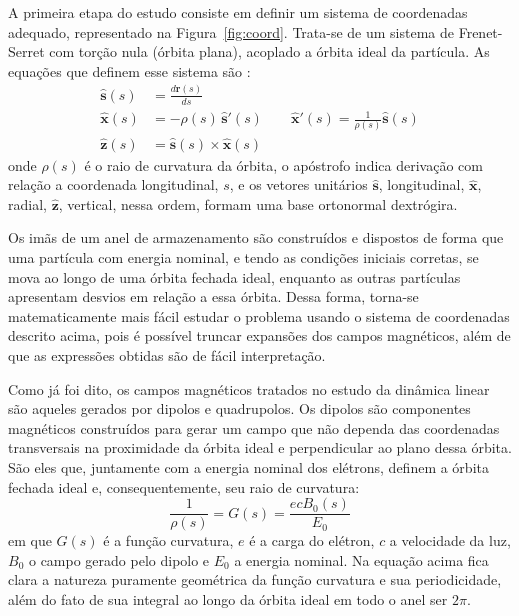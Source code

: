 A primeira etapa do estudo consiste em definir um sistema de coordenadas adequado, representado na \mbox{Figura~\ref{fig:coord}}. Trata-se de um sistema de Frenet-Serret com torção nula (órbita plana), acoplado a órbita ideal da partícula.
As equações que definem esse sistema são \cite{frenet}:
\begin{align} \label{eq:coord}
 \hat{\mathbf{s}}(s) &= \frac{d\mathbf{r}(s)}{d s} \nonumber\\
 \hat{\mathbf{x}}(s) &= -\rho(s)\,\hat{\mathbf{s}}'(s) \qquad
\hat{\mathbf{x}}'(s)=\frac{1}{\rho(s)}\hat{\mathbf{s}}(s) \\
 \hat{\mathbf{z}}(s) &= \hat{\mathbf{s}}(s)\times\hat{\mathbf{x}}(s)
\nonumber
\end{align}
onde $\rho(s)$ é o raio de curvatura da órbita, o apóstrofo indica derivação com relação a coordenada longitudinal, $s$, e os vetores unitários $\hat{\mathbf{s}}$, longitudinal, $\hat{\mathbf{x}}$, radial,
$\hat{\mathbf{z}}$, vertical, nessa ordem, formam uma base ortonormal dextrógira.


Os imãs de um anel de armazenamento são construídos e dispostos de forma que uma partícula com energia nominal, e tendo as condições iniciais corretas, se mova ao longo de uma órbita fechada ideal, enquanto as outras partículas apresentam
desvios em relação a essa órbita. Dessa forma, torna-se matematicamente mais fácil estudar o problema usando o sistema de coordenadas descrito acima, pois é possível truncar expansões dos campos magnéticos, além de que as expressões obtidas são de fácil interpretação.

Como já foi dito, os campos magnéticos tratados no estudo da dinâmica linear são aqueles gerados por dipolos e quadrupolos. Os dipolos são componentes magnéticos construídos para gerar um campo que não dependa das coordenadas transversais na proximidade da órbita ideal e perpendicular ao plano dessa
órbita. São eles que, juntamente com a energia nominal dos elétrons, definem a órbita fechada ideal e, consequentemente, seu raio de curvatura:
\begin{equation}
 \frac{1}{\rho(s)}=G(s)=\frac{ecB_0(s)}{E_0}
\end{equation}
em que $G(s)$ é a função curvatura, $e$ é a carga do elétron, $c$ a velocidade da luz, $B_0$ o campo gerado pelo dipolo e $E_0$ a energia nominal. Na equação acima fica clara a natureza puramente geométrica da função curvatura e sua periodicidade, além do fato de sua integral ao longo da órbita
ideal em todo o anel ser $2\pi$.


